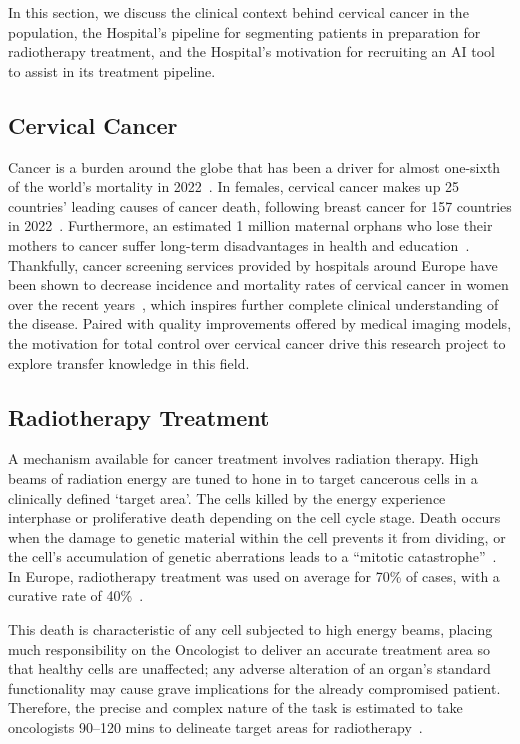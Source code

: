 \documentclass[12pt,twoside]{report}
\begin{document}
In this section, we discuss the clinical context behind cervical cancer in the population, the Hospital's pipeline for segmenting patients in preparation for radiotherapy treatment, and the Hospital's motivation for recruiting an AI tool to assist in its treatment pipeline. 

\subsection{Cervical Cancer}\label{sect:cervical-cancer}

Cancer is a burden around the globe that has been a driver for almost one-sixth of the world's mortality in 2022~\cite{Global-cancer-2022}. In females, cervical cancer makes up 25 countries' leading causes of cancer death, following breast cancer for 157 countries in 2022~\cite{Global-cancer-2022}. Furthermore, an estimated 1 million maternal orphans who lose their mothers to cancer suffer long-term disadvantages in health and education~\cite{Guida2022}. Thankfully, cancer screening services provided by hospitals around Europe have been shown to decrease incidence and mortality rates of cervical cancer in women over the recent years~\cite{Global-cancer-2022}, which inspires further complete clinical understanding of the disease. Paired with quality improvements offered by medical imaging models, the motivation for total control over cervical cancer drive this research project to explore transfer knowledge in this field. %

\subsection{Radiotherapy Treatment}

A mechanism available for cancer treatment involves radiation therapy. High beams of radiation energy are tuned to hone in to target cancerous cells in a clinically defined `target area'. The cells killed by the energy experience interphase or proliferative death depending on the cell cycle stage. Death occurs when the damage to genetic material within the cell prevents it from dividing, or the cell's accumulation of genetic aberrations leads to a ``mitotic catastrophe''~\cite{cell-death}. In Europe, radiotherapy treatment was used on average for 70\% of cases, with a curative rate of 40\%~\cite{radiotherapy-advances, Thompson2018}.

This death is characteristic of any cell subjected to high energy beams, placing much responsibility on the Oncologist to deliver an accurate treatment area so that healthy cells are unaffected; any adverse alteration of an organ's standard functionality may cause grave implications for the already compromised patient. Therefore, the precise and complex nature of the task is estimated to take oncologists 90--120 mins to delineate target areas for radiotherapy~\cite{LIU2020184}.
\end{document}
